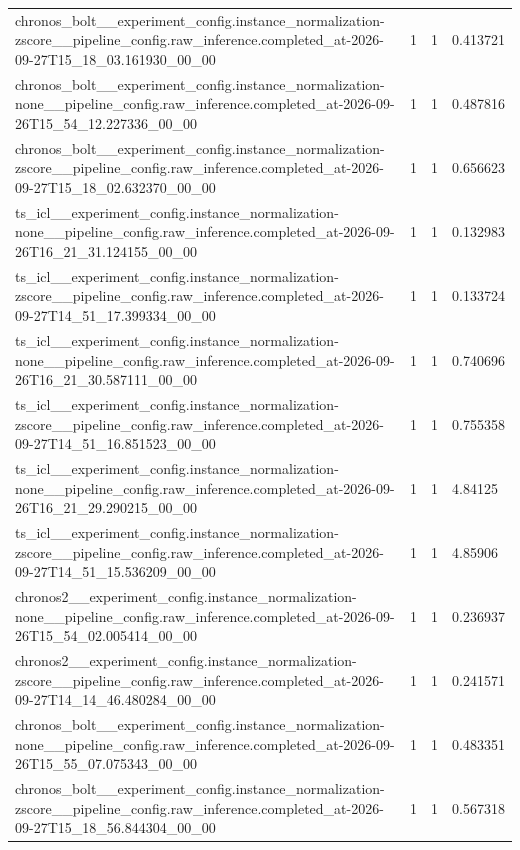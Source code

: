 \begin{tabular}{llll}
chronos\_bolt\_\_experiment\_config.instance\_normalization-zscore\_\_pipeline\_config.raw\_inference.completed\_at-2026-09-27T15\_18\_03.161930\_00\_00 & 1 & 1 & 0.413721 \\
chronos\_bolt\_\_experiment\_config.instance\_normalization-none\_\_pipeline\_config.raw\_inference.completed\_at-2026-09-26T15\_54\_12.227336\_00\_00 & 1 & 1 & 0.487816 \\
chronos\_bolt\_\_experiment\_config.instance\_normalization-zscore\_\_pipeline\_config.raw\_inference.completed\_at-2026-09-27T15\_18\_02.632370\_00\_00 & 1 & 1 & 0.656623 \\
ts\_icl\_\_experiment\_config.instance\_normalization-none\_\_pipeline\_config.raw\_inference.completed\_at-2026-09-26T16\_21\_31.124155\_00\_00 & 1 & 1 & 0.132983 \\
ts\_icl\_\_experiment\_config.instance\_normalization-zscore\_\_pipeline\_config.raw\_inference.completed\_at-2026-09-27T14\_51\_17.399334\_00\_00 & 1 & 1 & 0.133724 \\
ts\_icl\_\_experiment\_config.instance\_normalization-none\_\_pipeline\_config.raw\_inference.completed\_at-2026-09-26T16\_21\_30.587111\_00\_00 & 1 & 1 & 0.740696 \\
ts\_icl\_\_experiment\_config.instance\_normalization-zscore\_\_pipeline\_config.raw\_inference.completed\_at-2026-09-27T14\_51\_16.851523\_00\_00 & 1 & 1 & 0.755358 \\
ts\_icl\_\_experiment\_config.instance\_normalization-none\_\_pipeline\_config.raw\_inference.completed\_at-2026-09-26T16\_21\_29.290215\_00\_00 & 1 & 1 & 4.84125 \\
ts\_icl\_\_experiment\_config.instance\_normalization-zscore\_\_pipeline\_config.raw\_inference.completed\_at-2026-09-27T14\_51\_15.536209\_00\_00 & 1 & 1 & 4.85906 \\
chronos2\_\_experiment\_config.instance\_normalization-none\_\_pipeline\_config.raw\_inference.completed\_at-2026-09-26T15\_54\_02.005414\_00\_00 & 1 & 1 & 0.236937 \\
chronos2\_\_experiment\_config.instance\_normalization-zscore\_\_pipeline\_config.raw\_inference.completed\_at-2026-09-27T14\_14\_46.480284\_00\_00 & 1 & 1 & 0.241571 \\
chronos\_bolt\_\_experiment\_config.instance\_normalization-none\_\_pipeline\_config.raw\_inference.completed\_at-2026-09-26T15\_55\_07.075343\_00\_00 & 1 & 1 & 0.483351 \\
chronos\_bolt\_\_experiment\_config.instance\_normalization-zscore\_\_pipeline\_config.raw\_inference.completed\_at-2026-09-27T15\_18\_56.844304\_00\_00 & 1 & 1 & 0.567318 \\

\end{tabular}

